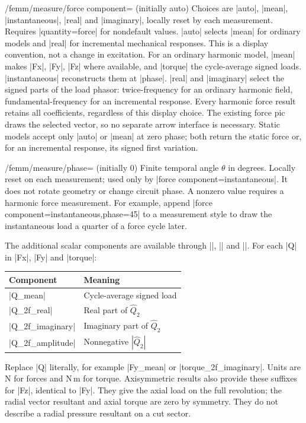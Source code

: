 \begin{key}{/femm/measure/force component= (initially auto)}
Choices are |auto|, |mean|, |instantaneous|, |real| and |imaginary|, locally reset
by each measurement. Requires |quantity=force| for nondefault values.
|auto| selects |mean| for ordinary models and |real| for incremental mechanical
responses. This is a display convention, not a change in excitation.
For an ordinary harmonic model, |mean| makes |Fx|, |Fy|, |Fz| where available, and |torque| the cycle-average
signed loads. |instantaneous| reconstructs them at |phase|. |real| and
|imaginary| select the signed parts of the load phasor: twice-frequency for
an ordinary harmonic field, fundamental-frequency for an incremental response. Every harmonic force result retains all coefficients,
regardless of this display choice. The existing force pic draws the selected
vector, so no separate arrow interface is necessary. Static models accept only
|auto| or |mean| at zero phase; both return the static force or, for an
incremental response, its signed first variation.
\end{key}
\begin{key}{/femm/measure/phase= (initially 0)}
Finite temporal angle $\theta$ in degrees. Locally reset on each measurement;
used only by |force component=instantaneous|. It does not rotate geometry or
change circuit phase. A nonzero value requires a harmonic force measurement.
For example, append |force component=instantaneous,phase=45| to a measurement
style to draw the instantaneous load a quarter of a force cycle later.
\end{key}

The additional scalar components are available through |\femmresult|,
|\femmvalue| and |\femmresultplot|. For each |Q| in |Fx|, |Fy| and |torque|:
\begin{center}\begin{tabular}{ll}\toprule
Component & Meaning\\\midrule
|Q_mean| & Cycle-average signed load\\
|Q_2f_real| & Real part of $\widehat Q_2$\\
|Q_2f_imaginary| & Imaginary part of $\widehat Q_2$\\
|Q_2f_amplitude| & Nonnegative $|\widehat Q_2|$\\\bottomrule
\end{tabular}\end{center}
Replace |Q| literally, for example |Fy_mean| or |torque_2f_imaginary|.
Units are N for forces and N\,m for torque. Axisymmetric results also provide
these suffixes for |Fz|, identical to |Fy|. They give the axial load on the full
revolution; the radial vector resultant and axial torque are zero by symmetry.
They do not describe a radial pressure resultant on a cut sector.

